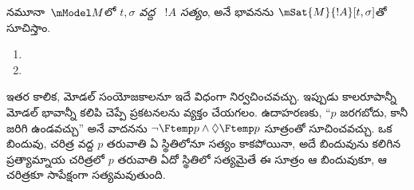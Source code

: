 \documentclass[../../../include/open-logic-section]{subfiles}
\begin{document}
\begin{defn}
  నమూనా~$\mModel M$లో \emph{$t, \sigma$ వద్ద
  ~$!A$ సత్యం},
  అనే భావనను $\mSat{M}{!A}[t, \sigma]$తో సూచిస్తాం.
  \begin{enumerate}
  \item{} 
  \item{} 
  \end{enumerate}
\end{defn}

ఇతర కాలిక, మోడల్ సంయోజకాలనూ ఇదే విధంగా
నిర్వచించవచ్చు. ఇప్పుడు కాలరూపాన్నీ మోడల్ భావాన్నీ కలిపి చెప్పే ప్రకటనలను వ్యక్తం చేయగలం. ఉదాహరణకు,
``$p$ జరగబోదు, కానీ జరిగి ఉండవచ్చు'' అనే వాదనను
$\lnot \Ftemp p \land \Diamond \Ftemp p$
సూత్రంతో సూచించవచ్చు. ఒక బిందువు, చరిత్ర వద్ద
$p$ తరువాతి ఏ స్థితిలోనూ సత్యం కాకపోయినా, అదే
బిందువును కలిగిన ప్రత్యామ్నాయ చరిత్రలో $p$ తరువాతి
ఏదో స్థితిలో సత్యమైతే
ఈ సూత్రం ఆ బిందువుకూ, ఆ చరిత్రకూ సాపేక్షంగా సత్యమవుతుంది.
\end{document}
